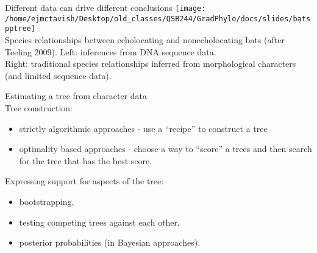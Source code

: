 \documentclass{beamer}
\begin{document}
\begin{frame}
Different data can drive different conclusions
 \texttt{[image: /home/ejmctavish/Desktop/old\_classes/QSB244/GradPhylo/docs/slides/batspptree]}\\
Species relationships between echolocating and nonecholocating bats (after Teeling 2009).
Left: inferences from DNA sequence data.\\
Right: traditional species relationships inferred from morphological characters (and limited sequence data).
\citep{hahn_irrational_2016}
\end{frame}



\begin{frame}
Estimating a tree from character data\\
Tree construction:
\begin{itemize}
 \item strictly algorithmic approaches - use a “recipe” to construct a tree
  \item optimality based approaches - choose a way to “score” a trees and then search for the tree that has the best score.
\end{itemize}

Expressing support for aspects of the tree:
\begin{itemize}
 \item  bootstrapping,
 \item testing competing trees against each other,
 \item posterior probabilities (in Bayesian approaches).
\end{itemize}
\end{frame}


\appendix
\begin{frame}[allowframebreaks]
 
\end{frame}
\end{document}
